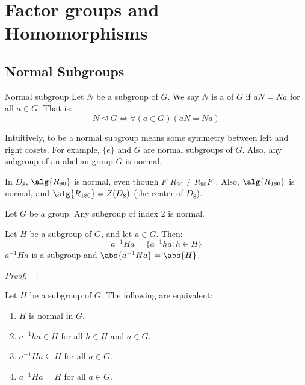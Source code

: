 \chapter{Factor groups and Homomorphisms}

\section{Normal Subgroups}

\begin{dfnbox}{Normal subgroup}{}
    Let $N$ be a subgroup of $G$. We say $N$ is a  of $G$ if $aN = Na$ for all $a \in G$. That is:
    \[ N \trianglelefteq G \iff \forall (a \in G)(aN = Na) \]
\end{dfnbox}

Intuitively, to be a normal subgroup means some symmetry between left and right cosets. For example, $\{e\}$ and $G$ are normal subgroups of $G$. Also, any subgroup of an abelian group $G$ is normal.

In $D_8$, $\alg{R_{90}}$ is normal, even though $F_1 R_{90} \neq R_{90}F_1$. Also, $\alg{R_{180}}$ is normal, and $\alg{R_{180}} = Z(D_8)$ (the center of $D_8$).

\begin{thmbox}{}{}
    Let $G$ be a group. Any subgroup of index $2$ is normal.
\end{thmbox}

\begin{thmbox}{}{}
    Let $H$ be a subgroup of $G$, and let $a \in G$. Then:
    \[ a^{-1}Ha = \{ a^{-1}ha : h \in H \} \]
    $a^{-1}Ha$ is a subgroup and $\abs{a^{-1}Ha} = \abs{H}$.
    \tcblower
    \begin{proof}
        
    \end{proof}
\end{thmbox}

\begin{thmbox}{}{}
    Let $H$ be a subgroup of $G$. The following are equivalent:
    \begin{enumerate}
        \item $H$ is normal in $G$.
        \item $a^{-1}ha \in H$ for all $h \in H$ and $a \in G$.
        \item $a^{-1}Ha \subseteq H$ for all $a \in G$.
        \item $a^{-1}Ha = H$ for all $a \in G$.
    \end{enumerate}
\end{thmbox}

